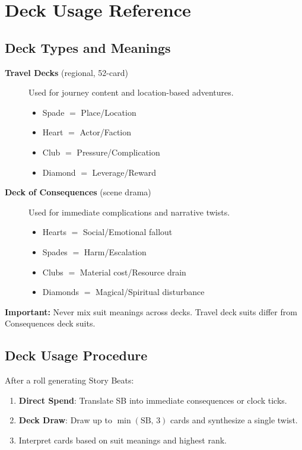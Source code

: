 \section{Deck Usage Reference}
\label{sec:deck-reference}

\subsection{Deck Types and Meanings}
\label{subsec:deck-types}

\begin{description}
\item[\textbf{Travel Decks} (regional, 52-card)] Used for journey content and location-based adventures.
\begin{itemize}
\item Spade $=$ Place/Location
\item Heart $=$ Actor/Faction
\item Club $=$ Pressure/Complication
\item Diamond $=$ Leverage/Reward
\end{itemize}

\item[\textbf{Deck of Consequences} (scene drama)] Used for immediate complications and narrative twists.
\begin{itemize}
\item Hearts $=$ Social/Emotional fallout
\item Spades $=$ Harm/Escalation
\item Clubs $=$ Material cost/Resource drain
\item Diamonds $=$ Magical/Spiritual disturbance
\end{itemize}
\end{description}

\textbf{Important:} Never mix suit meanings across decks. Travel deck suits differ from Consequences deck suits.

\subsection{Deck Usage Procedure}
\label{subsec:deck-procedure}

After a roll generating Story Beats:
\begin{enumerate}
\item \textbf{Direct Spend}: Translate SB into immediate consequences or clock ticks.
\item \textbf{Deck Draw}: Draw up to $\min(\text{SB},\,3)$ cards and synthesize a single twist.
\item Interpret cards based on suit meanings and highest rank.
\end{enumerate}

